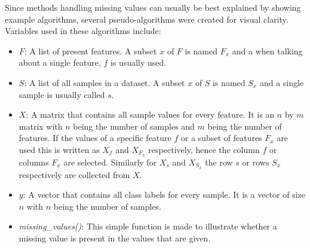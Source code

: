\documentclass[10pt,a4paper]{article}
\begin{document}
	Since methods handling missing values can usually be best explained by showing example algorithms, several pseudo-algorithms were created for visual clarity. Variables used in these algorithms include:
	\begin{itemize}
		\item \textit{$F$}: A list of present features. A subset $x$ of $F$ is named $F_x$ and a when talking about a single feature, $f$ is usually used.
		\item \textit{$S$}: A list of all samples in a dataset. A subset $x$ of $S$ is named $S_x$ and a single sample is usually called $s$. 
		\item \textit{$X$}: A matrix that contains all sample values for every feature. It is an $n$ by $m$ matrix with $n$ being the number of samples and $m$ being the number of features. If the values of a specific feature $f$ or a subset of features $F_x$ are used this is written as $X_f$ and $X_{F_x}$ respectively, hence the column $f$ or columns $F_x$ are selected. Similarly for $X_s$ and $X_{S_x}$ the row $s$ or rows $S_x$ respectively are collected from $X$.
		\item \textit{$y$}: A vector that contains all class labels for every sample. It is a vector of size $n$ with $n$ being the number of samples.
		\item \textit{missing\_values()}: This simple function is made to illustrate whether a missing value is present in the values that are given.
	\end{itemize}
	
	

	
	
	
	
	
\end{document}
